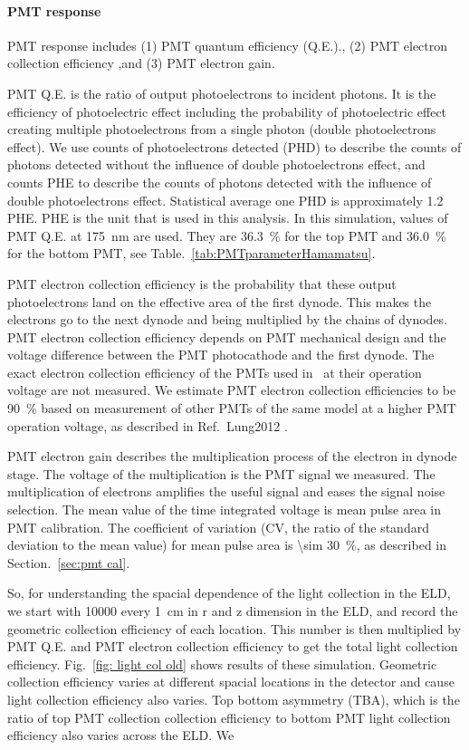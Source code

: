 \paragraph{PMT response} PMT response includes (1) PMT quantum efficiency (Q.E.)., (2) PMT electron collection efficiency ,and (3) PMT electron gain. 

PMT Q.E. is the ratio of output photoelectrons to incident photons. It is the efficiency of photoelectric effect including the probability of photoelectric effect creating multiple photoelectrons from a single photon (double photoelectrons effect).  
We use counts of photoelectrons detected (PHD) to describe the counts of photons detected without the influence of double photoelectrons effect, and counts PHE to describe the counts of photons detected with the influence of double photoelectrons effect. 
Statistical average one PHD is approximately \num{1.2} PHE. PHE is the unit that is used in this analysis. 
In this simulation, values of PMT Q.E. at \SI{175}{\nm} are used. They are \SI{36.3}{\percent} for the top PMT and \SI{36.0}{\percent} for the bottom PMT, see Table.~\ref{tab:PMTparameterHamamatsu}. 

PMT electron collection efficiency is the probability that these output photoelectrons land on the effective area of the first dynode. This makes the electrons go to the next dynode and being multiplied by the chains of dynodes. PMT electron collection efficiency depends on PMT mechanical design and the voltage difference between the PMT photocathode and the first dynode. The exact electron collection efficiency of the PMTs used in \gtest\ at their operation voltage are not measured. We estimate PMT electron collection efficiencies to be \SI{90}{\percent} based on measurement of other PMTs of the same model at a higher PMT operation voltage, as described in Ref.~{Lung2012
}.

PMT electron gain describes the multiplication process of the electron in dynode stage. The voltage of the multiplication is the PMT signal we measured. The multiplication of electrons amplifies the useful signal and eases the signal noise selection. The mean value of the time integrated voltage is mean pulse area in PMT calibration. The coefficient of variation (CV, the ratio of the standard deviation to the mean value) for mean pulse area is \SI{\sim 30}{\percent}, as described in Section.~\ref{sec:pmt cal}. 

So, for understanding the spacial dependence of the light collection in the ELD, we start with \num{10000} every \SI{1}{\cm} in r and z dimension in the ELD, and record the geometric collection efficiency of each location. This number is then multiplied by PMT Q.E. and PMT electron collection efficiency to get the total light collection efficiency. Fig.~\ref{fig: light col old} shows results of these simulation. Geometric collection efficiency varies at different spacial locations in the detector and cause light collection efficiency also varies. Top bottom asymmetry (TBA), which is the ratio of top PMT collection collection efficiency to bottom PMT light collection efficiency also varies across the ELD. We

